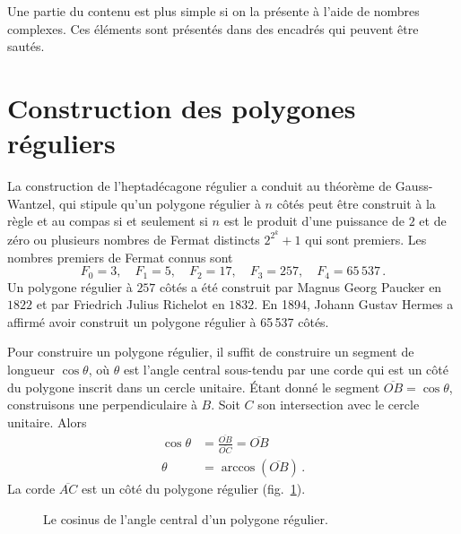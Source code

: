 Une partie du contenu est plus simple si on  la présente à l'aide de nombres complexes. Ces éléments sont présentés dans des encadrés qui peuvent être sautés.



\section{Construction des polygones réguliers}\label{s.hept-regular}

La construction de l'heptadécagone régulier a conduit au théorème de Gauss-Wantzel, qui stipule qu'un polygone régulier à $n$ côtés peut être construit à la règle et au  compas si et seulement si $n$ est le produit d'une puissance de $2$ et de zéro ou plusieurs nombres de Fermat distincts $2^{2^k}+1$ qui sont premiers. Les nombres premiers de Fermat connus sont 
\[
F_0=3,\quad F_1=5,\quad F_2=17,\quad F_3=257,\quad F_4=65\,537\,.
\]
Un polygone régulier à $257$ côtés a été construit par Magnus Georg Paucker en $1822$ et par Friedrich Julius Richelot en $1832$. En 1894, Johann Gustav Hermes a affirmé avoir construit un polygone régulier à 65\,537 côtés.

Pour construire un polygone régulier, il suffit de construire un segment  de longueur $\cos \theta$, où $\theta$ est l'angle central sous-tendu par une corde qui est un côté du polygone inscrit dans un cercle unitaire. Étant donné le segment $\overline{OB}=\cos\theta$, construisons une perpendiculaire à $B$. Soit $C$ son intersection avec le cercle unitaire. Alors 
\begin{align*}
\cos \theta&=\displaystyle\frac{\overline{OB}}{\overline{OC}}=\overline{OB}\\
\theta &= \arccos (\overline{OB})\,.
\end{align*}
La corde $\overline{AC}$ est un côté du polygone régulier  (fig.~\ref{f.hept-central1}).

\begin{figure}[htbp]
\centering
{}
\caption{Le cosinus de l'angle central d'un polygone régulier.}\label{f.hept-central1}
\end{figure}

